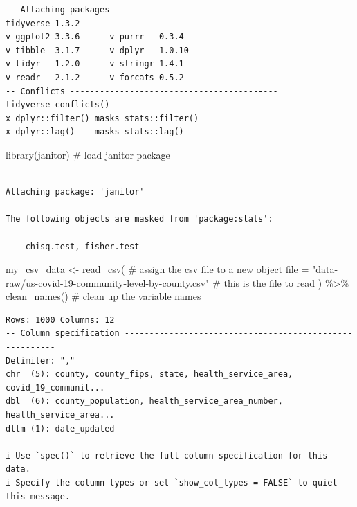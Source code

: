 \documentclass[
  letterpaper,
  DIV=11,
  numbers=noendperiod]{scrreprt}
\newenvironment{Shaded}{\begin{snugshade}}{\end{snugshade}}
\newcommand{\AttributeTok}[1]{\textcolor[rgb]{0.40,0.45,0.13}{#1}}
\newcommand{\CommentTok}[1]{\textcolor[rgb]{0.37,0.37,0.37}{#1}}
\newcommand{\FunctionTok}[1]{\textcolor[rgb]{0.28,0.35,0.67}{#1}}
\newcommand{\NormalTok}[1]{\textcolor[rgb]{0.00,0.23,0.31}{#1}}
\newcommand{\OtherTok}[1]{\textcolor[rgb]{0.00,0.23,0.31}{#1}}
\newcommand{\SpecialCharTok}[1]{\textcolor[rgb]{0.37,0.37,0.37}{#1}}
\newcommand{\StringTok}[1]{\textcolor[rgb]{0.13,0.47,0.30}{#1}}
\begin{document}
\begin{verbatim}
-- Attaching packages --------------------------------------- tidyverse 1.3.2 --
v ggplot2 3.3.6      v purrr   0.3.4 
v tibble  3.1.7      v dplyr   1.0.10
v tidyr   1.2.0      v stringr 1.4.1 
v readr   2.1.2      v forcats 0.5.2 
-- Conflicts ------------------------------------------ tidyverse_conflicts() --
x dplyr::filter() masks stats::filter()
x dplyr::lag()    masks stats::lag()
\end{verbatim}

\begin{Shaded}
\begin{Highlighting}[]
\FunctionTok{library}\NormalTok{(janitor) }\CommentTok{\# load janitor package}
\end{Highlighting}
\end{Shaded}

\begin{verbatim}

Attaching package: 'janitor'

The following objects are masked from 'package:stats':

    chisq.test, fisher.test
\end{verbatim}

\begin{Shaded}
\begin{Highlighting}[]
\NormalTok{my\_csv\_data }\OtherTok{\textless{}{-}} \FunctionTok{read\_csv}\NormalTok{( }\CommentTok{\# assign the csv file to a new object}
  \AttributeTok{file =} \StringTok{"data{-}raw/us{-}covid{-}19{-}community{-}level{-}by{-}county.csv"} \CommentTok{\# this is the file to read}
\NormalTok{) }\SpecialCharTok{\%\textgreater{}\%}
  \FunctionTok{clean\_names}\NormalTok{() }\CommentTok{\# clean up the variable names}
\end{Highlighting}
\end{Shaded}

\begin{verbatim}
Rows: 1000 Columns: 12
-- Column specification --------------------------------------------------------
Delimiter: ","
chr  (5): county, county_fips, state, health_service_area, covid_19_communit...
dbl  (6): county_population, health_service_area_number, health_service_area...
dttm (1): date_updated

i Use `spec()` to retrieve the full column specification for this data.
i Specify the column types or set `show_col_types = FALSE` to quiet this message.
\end{verbatim}
\end{document}
